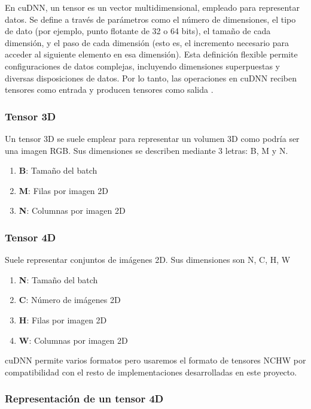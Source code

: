 En cuDNN, un tensor es un vector multidimensional, empleado para representar datos. Se define a través de parámetros como el número de dimensiones, el tipo de dato (por ejemplo, punto flotante de 32 o 64 bits), el tamaño de cada dimensión, y el paso de cada dimensión (esto es, el incremento necesario para acceder al siguiente elemento en esa dimensión). Esta definición flexible permite configuraciones de datos complejas, incluyendo dimensiones superpuestas y diversas disposiciones de datos. Por lo tanto, las operaciones en cuDNN reciben tensores como entrada y producen tensores como salida \cite{cuDNN_core_concepts}.

\subsubsection{Tensor 3D}
Un tensor 3D se suele emplear para representar un volumen 3D como podría ser una imagen RGB. Sus dimensiones se describen mediante 3 letras: B, M y N.

\begin{enumerate}
	\item \textbf{B}: Tamaño del batch
	\item \textbf{M}: Filas por imagen 2D
	\item \textbf{N}: Columnas por imagen 2D
\end{enumerate}

\subsubsection{Tensor 4D}
Suele representar conjuntos de imágenes 2D. Sus dimensiones son N, C, H, W

\begin{enumerate}
	\item \textbf{N}: Tamaño del batch
	\item \textbf{C}: Número de imágenes 2D
	\item \textbf{H}: Filas por imagen 2D
	\item \textbf{W}: Columnas por imagen 2D
\end{enumerate}

cuDNN permite varios formatos pero usaremos el formato de tensores NCHW por compatibilidad con el resto de implementaciones desarrolladas en este proyecto.


\subsubsection{Representación de un tensor 4D}

